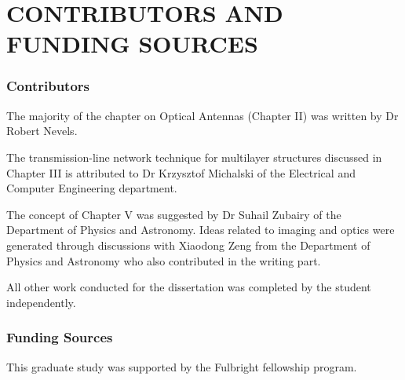 %
%
%
%


\chapter*{CONTRIBUTORS AND FUNDING SOURCES}


\subsection*{Contributors}

The majority of the chapter on Optical Antennas (Chapter II) was written by Dr Robert Nevels.

The transmission-line network technique for multilayer structures discussed in Chapter III is attributed to Dr Krzysztof Michalski of the Electrical and Computer Engineering department.

The concept of Chapter V was suggested by Dr Suhail Zubairy of the Department of Physics and Astronomy. Ideas related to imaging and optics were generated through discussions with Xiaodong Zeng from the Department of Physics and Astronomy who also contributed in the writing part.

All other work conducted for the dissertation was completed by the student independently.

\subsection*{Funding Sources}
This graduate study was supported by the Fulbright fellowship program.
\pagebreak{}
